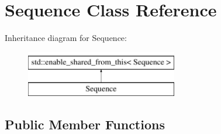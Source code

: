 \hypertarget{classSequence}{\section{Sequence Class Reference}
\label{classSequence}
}
Inheritance diagram for Sequence\-:\begin{figure}[H]
\begin{center}
\leavevmode
\includegraphics[height=2.000000cm]{classSequence}
\end{center}
\end{figure}
\subsection*{Public Member Functions}
